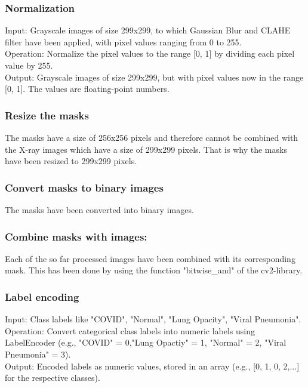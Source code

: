 \documentclass{article}
\begin{document}
\subsubsection{Normalization}
Input: Grayscale images of size 299x299, to which Gaussian Blur and CLAHE filter have been applied, with pixel values ranging from 0 to 255.\\
Operation: Normalize the pixel values to the range [0, 1] by dividing each pixel value by 255.\\
Output: Grayscale images of size 299x299, but with pixel values now in the range [0, 1]. The values are floating-point numbers.\\

\subsubsection{Resize the masks}
The masks have a size of 256x256 pixels and therefore cannot be combined with the X-ray images which have a size of 299x299 pixels. 
That is why the masks have been resized to 299x299 pixels.

\subsubsection{Convert masks to binary images}
The masks have been converted into binary images. 

\subsubsection{Combine masks with images:}

Each of the so far processed images have been combined with its corresponding mask. This has been done by using the function "bitwise\_and" of the cv2-library.\\
   
\subsubsection{Label encoding}
Input: Class labels like "COVID", "Normal", "Lung Opacity", "Viral Pneumonia".\\
Operation: Convert categorical class labels into numeric labels using LabelEncoder (e.g., "COVID" = 0,"Lung Opactiy" = 1, "Normal" = 2, "Viral Pneumonia" = 3).\\
Output: Encoded labels as numeric values, stored in an array (e.g., [0, 1, 0, 2,...] for the respective classes).\\
\end{document}
